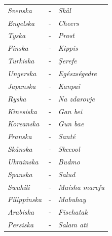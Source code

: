 \renewcommand{\arraystretch}{1.2}
\begin{tabular}{l l l}
    \textit{Svenska} & - & \hspace{10pt} \textit{Skål} \\
    \textit{Engelska} & - & \hspace{10pt} \textit{Cheers} \\
    \textit{Tyska} & - & \hspace{10pt} \textit{Prost} \\
    \textit{Finska} & - & \hspace{10pt} \textit{Kippis} \\
    \textit{Turkiska} & - & \hspace{10pt} \textit{Şerefe} \\
    \textit{Ungerska} & - & \hspace{10pt} \textit{Egészségedre} \\
    \textit{Japanska} & - & \hspace{10pt} \textit{Kanpai} \\
    \textit{Ryska} & - & \hspace{10pt} \textit{Na zdarovje} \\
    \textit{Kinesiska} & - & \hspace{10pt} \textit{Gan bei} \\
    \textit{Koreanska} & - & \hspace{10pt} \textit{Gun bae} \\
    \textit{Franska} & - & \hspace{10pt} \textit{Santé} \\
    \textit{Skånska} & - & \hspace{10pt} \textit{Skeeool} \\
    \textit{Ukrainska} & - & \hspace{10pt} \textit{Budmo} \\
    \textit{Spanska} & - & \hspace{10pt} \textit{Salud} \\
    \textit{Swahili} & - & \hspace{10pt} \textit{Maisha marefu} \\
    \textit{Filippinska} & - & \hspace{10pt} \textit{Mabuhay} \\
    \textit{Arabiska} & - & \hspace{10pt} \textit{Fisehatak} \\
    \textit{Persiska} & - & \hspace{10pt} \textit{Salam ati} \\

\end{tabular}
